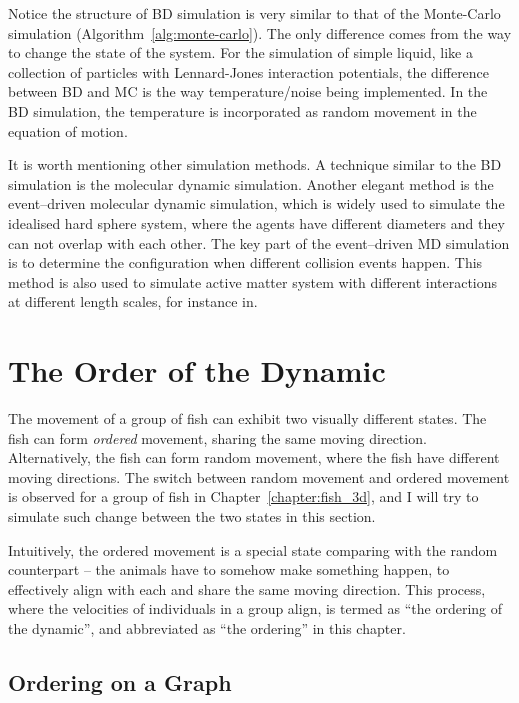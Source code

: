 \documentclass[11pt,twoside]{report}
\begin{document}
Notice the structure of BD simulation is very similar to that of the Monte-Carlo simulation (Algorithm~\ref{alg:monte-carlo}). The only difference comes from the way to change the state of the system. For the simulation of simple liquid, like a collection of particles with Lennard-Jones interaction potentials, the difference between BD and MC is the way temperature/noise being implemented. In the BD simulation, the temperature is incorporated as random movement in the equation of motion.

It is worth mentioning other simulation methods. A technique similar to the BD simulation is the molecular dynamic simulation. %
Another elegant method is the event--driven molecular dynamic simulation, which is widely used to simulate the idealised hard sphere system, where the agents have different diameters and they can not overlap with each other. The key part of the event--driven MD simulation is to determine the configuration when different collision events happen. This method is also used to simulate active matter system with different interactions at different length scales, for instance in.


\section{The Order of the Dynamic}

The movement of a group of fish can exhibit two visually different states. The fish can form \emph{ordered} movement, sharing the same moving direction. Alternatively, the fish can form random movement, where the fish have different moving directions.
The switch between random movement and ordered movement is observed for a group of fish in Chapter~\ref{chapter:fish_3d}, and I will try to simulate such change between the two states in this section.

Intuitively, the ordered movement is a special state comparing with the random counterpart -- the animals have to somehow make something happen, to effectively align with each and share the same moving direction. This process, where the velocities of individuals in a group align, is termed as ``the ordering of the dynamic'', and abbreviated as ``the ordering'' in this chapter.

\subsection{Ordering on a Graph}
\end{document}
